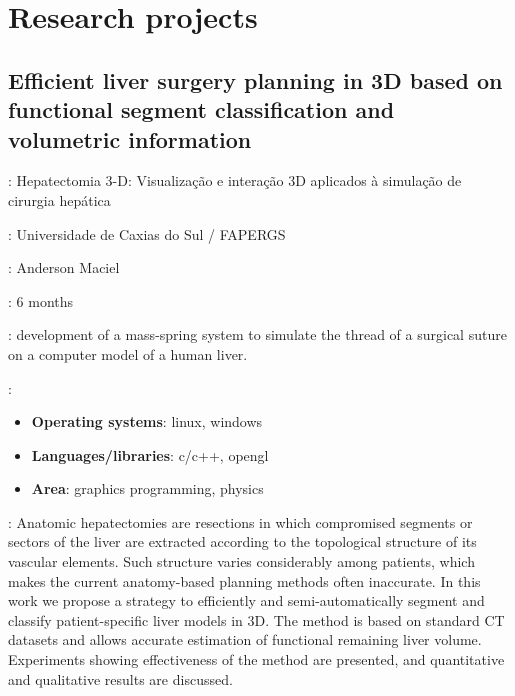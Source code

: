\section*{Research projects}

\subsection*{
    Efficient liver surgery planning in 3D based on functional segment
    classification and volumetric information}

\begin{description}[noitemsep]
    \item[Original title]:
        Hepatectomia 3-D: Visualização e interação 3D aplicados à simulação de
        cirurgia hepática
    \item[Institution]: Universidade de Caxias do Sul / FAPERGS
    \item[Advisor]: Anderson Maciel
    \item[Duration]: 6 months
    \item[Attributions]:
        development of a mass-spring system to simulate the thread of a
        surgical suture on a computer model of a human liver.
    \item[Technologies]:
        \begin{itemize}[noitemsep]
            \item \textbf{Operating systems}: linux, windows
            \item \textbf{Languages/libraries}: c/c++, opengl
            \item \textbf{Area}: graphics programming, physics
        \end{itemize}
    \item[Abstract]:
        Anatomic hepatectomies are resections in which compromised segments or
        sectors of the liver are extracted according to the topological
        structure of its vascular elements. Such structure varies considerably
        among patients, which makes the current anatomy-based planning methods
        often inaccurate. In this work we propose a strategy to efficiently and
        semi-automatically segment and classify patient-specific liver models
        in 3D. The method is based on standard CT datasets and allows accurate
        estimation of functional remaining liver volume. Experiments showing
        effectiveness of the method are presented, and quantitative and
        qualitative results are discussed.
\end{description}

